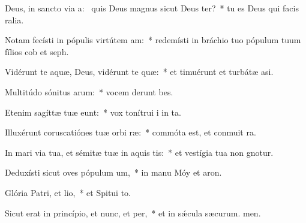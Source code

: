 \item Deus, in sancto via a:~\pscross{} quis Deus magnus sicut Deus ter?~* tu es Deus qui facis ralia.
\item Notam fecísti in pópulis virtútem am:~* redemísti in bráchio tuo pópulum tuum fílios cob et seph.
\item Vidérunt te aquæ, Deus, vidérunt te quæ:~* et timuérunt et turbátæ  asi.
\item Multitúdo sónitus arum:~* vocem derunt bes.
\item Etenim sagíttæ tuæ eunt:~* vox tonítrui i in ta.
\item Illuxérunt coruscatiónes tuæ orbi ræ:~* commóta est, et conmuit ra.
\item In mari via tua, et sémitæ tuæ in aquis tis:~* et vestígia tua non gnotur.
\item Deduxísti sicut oves pópulum um,~* in manu Móy et aron.
\item Glória Patri, et lio,~* et Spitui to.
\item Sicut erat in princípio, et nunc, et per,~* et in sǽcula sæcurum. men.
